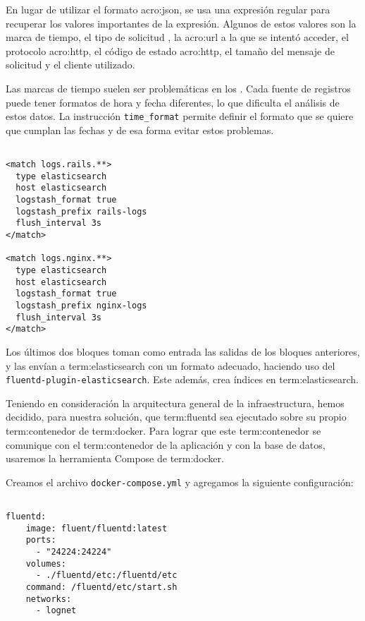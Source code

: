 En lugar de utilizar el formato \gls{acro:json}, se usa una expresión regular
para recuperar los valores importantes de la expresión. Algunos de estos
valores son la marca de tiempo, el tipo de solicitud , la \gls{acro:url} a
la que se intentó acceder, el protocolo \gls{acro:http}, el código de estado
\gls{acro:http}, el tamaño del mensaje de solicitud y el cliente 
utilizado.

Las marcas de tiempo suelen ser problemáticas en los . Cada fuente de
registros puede tener formatos de hora y fecha diferentes, lo que dificulta el
análisis de estos datos. La instrucción \lstinline{time_format} permite
definir el formato que se quiere que cumplan las fechas y de esa forma evitar
estos problemas.

\begin{lstlisting}

<match logs.rails.**>
  type elasticsearch
  host elasticsearch
  logstash_format true
  logstash_prefix rails-logs
  flush_interval 3s
</match>

<match logs.nginx.**>
  type elasticsearch
  host elasticsearch
  logstash_format true
  logstash_prefix nginx-logs
  flush_interval 3s
</match>

\end{lstlisting}

Los últimos dos bloques toman como entrada las salidas de los bloques
anteriores, y las envían a \gls{term:elasticsearch} con un formato adecuado,
haciendo uso del  \texttt{fluentd-plugin-elasticsearch}. Este
 además, crea índices en \gls{term:elasticsearch}.

Teniendo en consideración la arquitectura general de la infraestructura, hemos
decidido, para nuestra solución, que \gls{term:fluentd} sea ejecutado sobre su
propio \gls{term:contenedor} de \gls{term:docker}. Para lograr que este
\gls{term:contenedor} se comunique con el \gls{term:contenedor} de la aplicación
y con la base de datos, usaremos la herramienta Compose de \gls{term:docker}.

Creamos el archivo \texttt{docker-compose.yml} y agregamos la siguiente
configuración:

\begin{lstlisting}

fluentd:
    image: fluent/fluentd:latest
    ports:
      - "24224:24224"
    volumes:
      - ./fluentd/etc:/fluentd/etc
    command: /fluentd/etc/start.sh
    networks:
      - lognet

\end{lstlisting}

